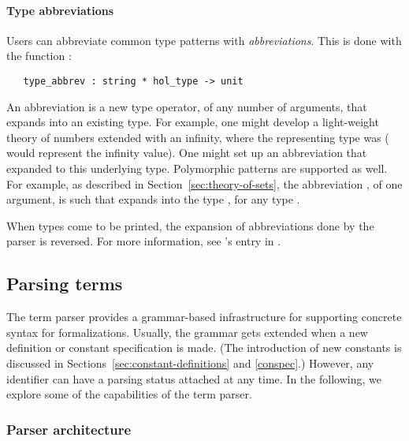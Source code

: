 \paragraph{Type abbreviations}

Users can abbreviate common type patterns with \emph{abbreviations}.
This is done with the \ML{} function :
\begin{hol}
\begin{verbatim}
   type_abbrev : string * hol_type -> unit
\end{verbatim}
\end{hol}
An abbreviation is a new type operator, of any number of arguments,
that expands into an existing type.  For example, one might develop a
light-weight theory of numbers extended with an infinity, where the
representing type was  ( would
represent the infinity value).  One might set up an abbreviation
 that expanded to this underlying type.
Polymorphic patterns are supported as well.  For example, as described
in Section~\ref{sec:theory-of-sets}, the abbreviation , of
one argument, is such that  expands into the type
, for any type .

When types come to be printed, the expansion of abbreviations done by the parser is reversed.
For more information, see 's entry in \REFERENCE.

\subsection{Parsing terms}

The term parser provides a grammar-based infrastructure for supporting
concrete syntax for formalizations. Usually, the \HOL{} grammar gets
extended when a new definition or constant specification is made. (The
introduction of new constants is discussed in
Sections~\ref{sec:constant-definitions} and \ref{conspec}.) However,
any identifier can have a parsing status attached at any time.
In the following, we explore some of the capabilities of the
\HOL{} term parser.


\subsubsection{Parser architecture}
\label{sec:parser:architecture}

